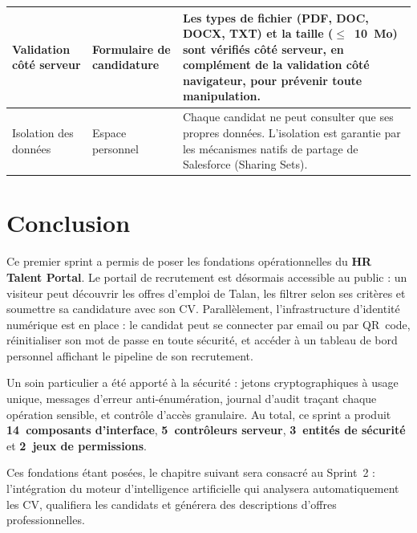 \begin{longtable}{|p{4cm}|p{4cm}|p{6.5cm}|}
Validation côté serveur & Formulaire de candidature & Les types de fichier (PDF, DOC, DOCX, TXT) et la taille ($\leq$~10~Mo) sont vérifiés côté serveur, en complément de la validation côté navigateur, pour prévenir toute manipulation. \\
\hline

Isolation des données & Espace personnel & Chaque candidat ne peut consulter que ses propres données. L'isolation est garantie par les mécanismes natifs de partage de Salesforce (Sharing Sets). \\
\hline

\end{longtable}

\FloatBarrier

\section{Conclusion}

Ce premier sprint a permis de poser les fondations opérationnelles du \textbf{HR Talent Portal}. Le portail de recrutement est désormais accessible au public : un visiteur peut découvrir les offres d'emploi de Talan, les filtrer selon ses critères et soumettre sa candidature avec son CV. Parallèlement, l'infrastructure d'identité numérique est en place : le candidat peut se connecter par email ou par QR~code, réinitialiser son mot de passe en toute sécurité, et accéder à un tableau de bord personnel affichant le pipeline de son recrutement.

\medskip

Un soin particulier a été apporté à la sécurité : jetons cryptographiques à usage unique, messages d'erreur anti-énumération, journal d'audit traçant chaque opération sensible, et contrôle d'accès granulaire. Au total, ce sprint a produit \textbf{14~composants d'interface}, \textbf{5~contrôleurs serveur}, \textbf{3~entités de sécurité} et \textbf{2~jeux de permissions}.

\medskip

Ces fondations étant posées, le chapitre suivant sera consacré au Sprint~2 : l'intégration du moteur d'intelligence artificielle qui analysera automatiquement les CV, qualifiera les candidats et générera des descriptions d'offres professionnelles.


